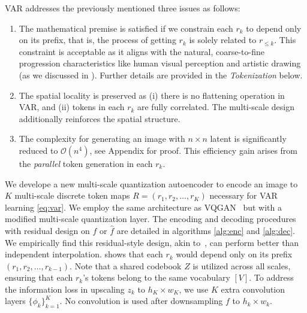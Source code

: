 VAR addresses the previously mentioned three issues as follows:

\begin{enumerate}[label=\arabic*),topsep=0.7pt,itemsep=2pt,leftmargin=20pt]
\item The mathematical premise is satisfied if we constrain each $r_k$ to depend only on its prefix, that is, the process of getting $r_k$ is solely related to $r_{\le k}$.
This constraint is acceptable as it aligns with the natural, coarse-to-fine progression characteristics like human visual perception and artistic drawing (as we discussed in ).
Further details are provided in the \textit{Tokenization} below.

\item The spatial locality is preserved as (i) there is no flattening operation in VAR, and (ii) tokens in each $r_k$ are fully correlated. The multi-scale design additionally reinforces the spatial structure.

\item The complexity for generating an image with $n\times n$ latent is significantly reduced to $\mathcal{O}(n^4)$, see Appendix for proof.
This efficiency gain arises from the \textit{parallel} token generation in each $r_k$.
\end{enumerate}

We develope a new multi-scale quantization autoencoder to encode an image to $K$ multi-scale discrete token maps $R=(r_1, r_2, \dots, r_K)$ necessary for VAR learning \eqref{eq:var}.
We employ the same architecture as VQGAN~\cite{vqgan} but with a modified multi-scale quantization layer.
The encoding and decoding procedures with residual design on $f$ or $\hat{f}$ are detailed in algorithms \ref{alg:enc} and \ref{alg:dec}.
We empirically find this residual-style design, akin to~\cite{rq}, can perform better than independent interpolation.
 shows that each $r_k$ would depend only on its prefix $(r_1, r_2, \dots, r_{k-1})$.
Note that a shared codebook $Z$ is utilized across all scales, ensuring that each $r_k$'s tokens belong to the same vocabulary $[V]$.
To address the information loss in upscaling $z_k$ to $h_K\times w_K$, we use $K$ extra convolution layers $\{\phi_k\}_{k=1}^K$.
No convolution is used after downsampling $f$ to $h_k\times w_k$.

